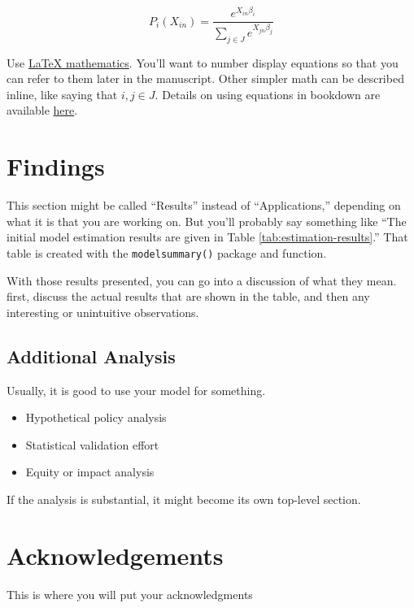 \documentclass[3p, authoryear]{elsarticle} %
\providecommand{\tightlist}{%
  \setlength{\itemsep}{0pt}\setlength{\parskip}{0pt}}
\begin{document}
\begin{equation}
  P_i(X_{in}) = \frac{e^{X_{in}\beta_i}}{\sum_{j \in J}e^{X_{jn}\beta_j}}
  \label{eq:mnl}
\end{equation}

Use \href{https://www.overleaf.com/learn/latex/mathematical_expressions}{LaTeX mathematics}.
You'll want to number display equations so that you can
refer to them later in the manuscript. Other simpler math can be described inline,
like saying that \(i, j \in J\). Details on using equations in bookdown are available
\href{https://bookdown.org/yihui/bookdown/markdown-extensions-by-bookdown.html}{here}.

\hypertarget{findings}{%
\section{Findings}\label{findings}}

This section might be called ``Results'' instead of ``Applications,'' depending
on what it is that you are working on. But you'll probably say something like
``The initial model estimation results are given in Table \ref{tab:estimation-results}.''
That table is created with the \texttt{modelsummary()} package and function.

With those results presented, you can go into a discussion of what they mean.
first, discuss the actual results that are shown in the table, and then any
interesting or unintuitive observations.

\hypertarget{additional-analysis}{%
\subsection{Additional Analysis}\label{additional-analysis}}

Usually, it is good to use your model for something.

\begin{itemize}
\tightlist
\item
  Hypothetical policy analysis
\item
  Statistical validation effort
\item
  Equity or impact analysis
\end{itemize}

If the analysis is substantial, it might become its own top-level section.

\hypertarget{acknowledgements}{%
\section*{Acknowledgements}\label{acknowledgements}}

This is where you will put your acknowledgments


\end{document}
